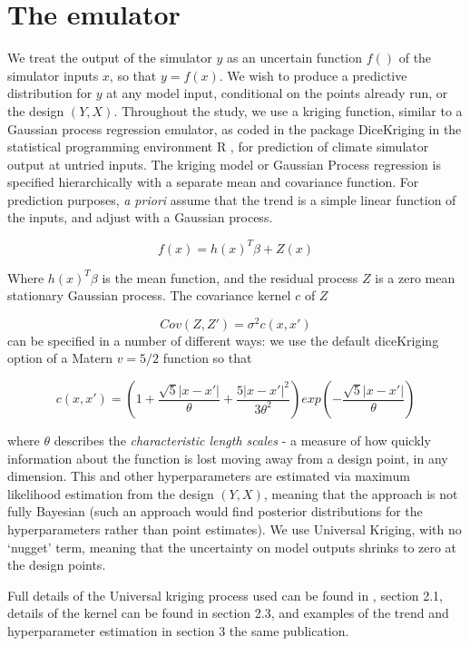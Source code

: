 \documentclass[gmd, manuscript]{copernicus} %
\begin{document}
\section{The emulator}

We treat the output of the simulator $y$ as an uncertain function $f()$ of the simulator inputs $x$, so that $y = f(x)$. We wish to produce a predictive distribution for $y$ at any model input, conditional on the points already run, or the design $(Y, X)$. Throughout the study, we use a kriging function, similar to a Gaussian process regression emulator, as coded in the package DiceKriging \citep{roustant2012dicekriging} in the statistical programming environment R \citep{Rcore2016}, for prediction of climate simulator output at untried inputs.
The kriging model or Gaussian Process regression is specified hierarchically with a separate mean and covariance function. For prediction purposes, \emph{a priori} assume that the trend is a simple linear function of the inputs, and adjust with a Gaussian process. 

$$
f(x) = h(x)^T \beta + Z(x)
$$

Where $h(x)^T \beta$ is the mean function, and the residual process $Z$ is a zero mean stationary Gaussian process. The covariance kernel $c$ of $Z$ 

$$
Cov(Z, Z') = \sigma^2 c(x,x')
$$
can be specified in a number of different ways: we use the default diceKriging option of a Matern $v=5/2$ function so that

$$
c(x,x') = (1 + \frac{\sqrt{5} | x - x'|}{\theta} + \frac{5 | x - x'|^2}{3 \theta^2})exp(- \frac{\sqrt{5} |x-x'|}{\theta})
$$

where $\theta$ describes the \emph{characteristic length scales} - a measure of how quickly information about the function is lost moving away from a design point, in any dimension. This and other hyperparameters are estimated via maximum likelihood estimation from the design $(Y, X)$, meaning that the approach is not fully Bayesian (such an approach would find posterior distributions for the hyperparameters rather than point estimates). We use Universal Kriging, with no `nugget' term, meaning that the uncertainty on model outputs shrinks to zero at the design points. 

Full details of the Universal kriging process used can be found in \citep{roustant2012dicekriging}, section 2.1, details of the kernel can be found in section 2.3, and examples of the trend and hyperparameter estimation  in section 3 the same publication. 
\end{document}
